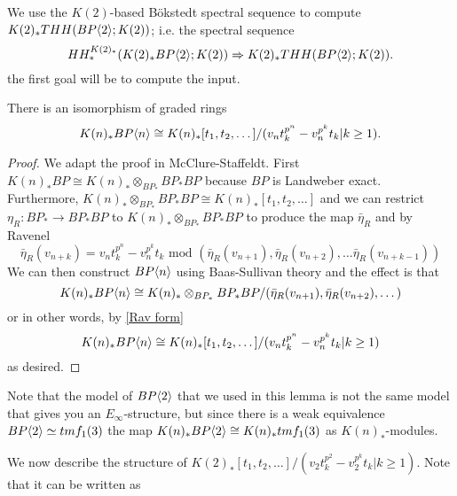 We use the $K(2)$-based B\"okstedt spectral sequence to compute $K(2)_*THH(BP\langle 2 \rangle;K(2))$; i.e. the spectral sequence
\[ HH_*^{K(2)_*}(K(2)_*BP\langle 2 \rangle;K(2))\Rightarrow K(2)_*THH(BP\langle 2 \rangle;K(2)).\]
the first goal will be to compute the input. 
\begin{lem}There is an isomorphism of graded rings
\[K(n)_*BP\langle n \rangle\cong K(n)_*[t_1,t_2, \dots]/(v_nt_k^{p^n}-v_n^{p^k}t_k | k\ge 1).\]
\end{lem}
\begin{proof}
We adapt the proof in McClure-Staffeldt. First $K(n)_*BP\cong K(n)_*\otimes_{BP_*}BP_*BP$ because $BP$ is Landweber exact. Furthermore, $K(n)_*\otimes_{BP_*}BP_*BP\cong K(n)_*[t_1,t_2,\dots]$ and we can restrict $\eta_R:BP_*\rightarrow BP_*BP$ to $K(n)_*\otimes_{BP_*}BP_*BP$ to produce the map $\bar{\eta}_R$ and by Ravenel 
\begin{equation}\label{Rav form} \bar{\eta}_R(v_{n+k})=v_nt_k^{p^n}-v_n^{p^k}t_k  \text{ mod } (\bar{\eta}_R(v_{n+1}),\bar{\eta}_R(v_{n+2}), \dots\bar{\eta}_R( v_{n+k-1}) )\end{equation}
We can then construct $BP\langle n \rangle$ using Baas-Sullivan theory and the effect is that 
\[ K(n)_*BP\langle n \rangle\cong K(n)_*\otimes_{BP_*}BP_*BP/(\bar{\eta}_R(v_{n+1}), \bar{\eta}_R(v_{n+2}), \dots )\]
or in other words, by \eqref{Rav form}
\[ K(n)_*BP\langle n \rangle \cong K(n)_*[t_1,t_2, \dots]/(v_nt_k^{p^n}-v_n^{p^k}t_k | k\ge 1) \]
as desired. 
\end{proof}
\begin{rem}
Note that the model of $BP\langle 2 \rangle$ that we used in this lemma is not the same model that gives you an $E_{\infty}$-structure, but since there is a weak equivalence $BP\langle 2 \rangle\simeq tmf_1(3)$ the map $K(n)_*BP\langle 2 \rangle\cong K(n)_*tmf_1(3)$ as $K(n)_*$-modules. 



\end{rem}
We now describe the structure of $K(2)_*[t_1,t_2, \dots]/(v_2t_k^{p^2}-v_2^{p^k}t_k | k\ge 1)$. Note that it can be written as 

